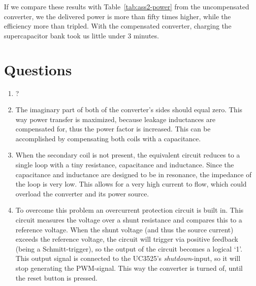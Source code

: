 \documentclass[11pt,titlepage]{report}
\begin{document}
If we compare these results with Table~\ref{tab:ass2-power} from the uncompensated converter, we the delivered power is more than fifty times higher, while the efficiency more than tripled.
With the compensated converter, charging the supercapacitor bank took us little under 3 minutes.

\section*{Questions}
\begin{enumerate}
\item
? %

\item
The imaginary part of both of the converter's sides should equal zero. This way power transfer is maximized, because leakage inductances are compensated for, thus the power factor is increased. This can be accomplished by compensating both coils with a capacitance.

\item
When the secondary coil is not present, the equivalent circuit reduces to a single loop with a tiny resistance, capacitance and inductance. Since the capacitance and inductance are designed to be in resonance, the impedance of the loop is very low. This allows for a very high current to flow, which could overload the converter and its power source.

\item
To overcome this problem an overcurrent protection circuit is built in. This circuit measures the voltage over a shunt resistance and compares this to a reference voltage. When the shunt voltage (and thus the source current) exceeds the reference voltage, the circuit will trigger via positive feedback (being a Schmitt-trigger), so the output of the circuit becomes a logical `1'. This output signal is connected to the UC3525's \textit{shutdown}-input, so it will stop generating the PWM-signal. This way the converter is turned of, until the reset button is pressed.
\end{enumerate}
\end{document}
